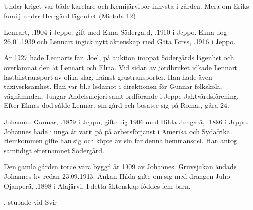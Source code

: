 Under kriget var både karelare och Kemijärvibor inhysta i gården. Mera om Eriks familj under Herrgård lägenhet (Mietala 12)


Lennart, .1904 i Jeppo, gift med Elma Södergård, .1910 i Jeppo. Elma dog 26.01.1939 och Lennart ingick nytt äktenskap med Göta Forss, .1916  i Jeppo.
\begin{jhchildren}
  \item {}
  \item {}
  \item {}
  \item {}
\end{jhchildren}

År 1927 hade Lennarts far, Joel, på auktion inropat Södergårds lägenhet och överlämnat den åt Lennart och Elma. Vid sidan av jordbruket idkade Lennart lastbilstransport av olika slag, främst grustransporter. Han hade även taxiverksamhet. Han var bl.a ledamot i direktionen för Gunnar folkskola, vägnämnden, Jungar Andelsmejeri samt ordförande i Jeppo Jaktvårdsförening. Efter Elmas död sålde Lennart sin gård och bosatte sig på Romar, gård 24.


Johannes Gunnar, .1879 i Jeppo, gifte sig 1906 med Hilda Jungarå, .1886 i Jeppo. Johannes hade i unga år varit på på arbetsförjänst i Amerika och Sydafrika. Hemkommen gifte han sig och köpte av sin far denna hemmansdel. Han antog samtidigt efternamnet Södergård.
\begin{jhchildren}
  \item {}
  \item {}
  \item {}
  \item {}
\end{jhchildren}

Den gamla gården torde vara byggd år 1909 av Johannes. Gruvsjukan ändade Johannes liv redan 23.09.1913. Änkan Hilda gifte om sig med drängen Juho Ojanperä, .1898 i Alajärvi. I detta äktenskap föddes fem barn.
\begin{jhchildren}
  \item {}
  \item {}
  \item {}
  \item {}, stupade vid Svir
  \item {}
\end{jhchildren}

